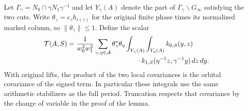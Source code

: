 \documentclass[a4paper,11pt]{article}
\theoremstyle{definition}
\theoremstyle{remark}
\numberwithin{equation}{section}
\begin{document}
Let \(\Gamma_\gamma=N_0\cap\gamma N_1\gamma^{-1}\) and let
\(Y_\gamma(A)\) denote the part of
\(\Gamma_\gamma\backslash G_\infty\) satisfying the two cuts.
Write \(\theta_\gamma=\epsilon_\gamma h_{i(\gamma)}\) for the
original finite phase times its normalized marked column, so
\(\|\theta_\gamma\|\le1\). Define the scalar
\begin{align*}
 \mathcal T(A,S)
 &=\frac{1}{w_0^2w_1^2}
      \sum_{\gamma,\eta\in\mathcal A}
      \theta_\gamma^*\theta_\eta
      \int_{Y_\gamma(A)}\int_{Y_\eta(A)}
            k_{0,S}(y,z)\\[-2pt]
 &\hspace{36mm}{}\cdot
            k_{1,S}(\eta^{-1}z,\gamma^{-1}y)\,dz\,dy .
\end{align*}
With original lifts, the product of the two local covariances
is the orbital covariance of the signed term. In particular
these integrals use the same arithmetic stabilizers as the full
period. Truncation respects that covariance by the change of
variable in the proof of the lemma.
\end{document}
